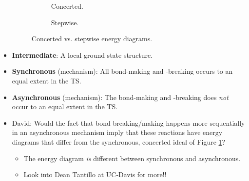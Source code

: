 \documentclass[../notes.tex]{subfiles}
\begin{document}
\begin{itemize}
    \begin{figure}[h!]
        \centering
        \begin{subfigure}[b]{0.25\linewidth}
            \centering
            \caption{Concerted.}
            \label{fig:concertedStepwiseNrga}
        \end{subfigure}
        \begin{subfigure}[b]{0.25\linewidth}
            \centering
            \caption{Stepwise.}
            \label{fig:concertedStepwiseNrgab}
        \end{subfigure}
        \caption{Concerted vs. stepwise energy diagrams.}
        \label{fig:concertedStepwiseNrg}
    \end{figure}
    \item \textbf{Intermediate}: A local ground state structure.
    \item \textbf{Synchronous} (mechanism): All bond-making and -breaking occurs to an equal extent in the TS.
    \item \textbf{Asynchronous} (mechanism): The bond-making and -breaking does \emph{not} occur to an equal extent in the TS.
    \item David: Would the fact that bond breaking/making happens more sequentially in an asynchronous mechanism imply that these reactions have energy diagrams that differ from the synchronous, concerted ideal of Figure \ref{fig:concertedStepwiseNrga}?
    \begin{itemize}
        \item The energy diagram \emph{is} different between synchronous and asynchronous.
        \item Look into Dean Tantillo at UC-Davis for more!!

\end{itemize}
\end{itemize}
\end{document}

